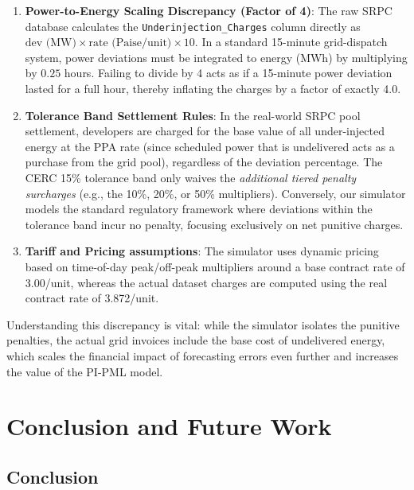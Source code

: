 \documentclass[12pt,a4paper]{report}
\begin{document}
\begin{enumerate}
  \item \textbf{Power-to-Energy Scaling Discrepancy (Factor of 4)}: The raw SRPC database calculates the \texttt{Underinjection\_Charges} column directly as $\text{dev (MW)} \times \text{rate (Paise/unit)} \times 10$. In a standard 15-minute grid-dispatch system, power deviations must be integrated to energy (MWh) by multiplying by $0.25$ hours. Failing to divide by 4 acts as if a 15-minute power deviation lasted for a full hour, thereby inflating the charges by a factor of exactly 4.0.
  \item \textbf{Tolerance Band Settlement Rules}: In the real-world SRPC pool settlement, developers are charged for the base value of all under-injected energy at the PPA rate (since scheduled power that is undelivered acts as a purchase from the grid pool), regardless of the deviation percentage. The CERC 15\% tolerance band only waives the \textit{additional tiered penalty surcharges} (e.g., the 10\%, 20\%, or 50\% multipliers). Conversely, our simulator models the standard regulatory framework where deviations within the tolerance band incur no penalty, focusing exclusively on net punitive charges.
  \item \textbf{Tariff and Pricing assumptions}: The simulator uses dynamic pricing based on time-of-day peak/off-peak multipliers around a base contract rate of \textnumero{}3.00/unit, whereas the actual dataset charges are computed using the real contract rate of \textnumero{}3.872/unit.
\end{enumerate}

Understanding this discrepancy is vital: while the simulator isolates the punitive penalties, the actual grid invoices include the base cost of undelivered energy, which scales the financial impact of forecasting errors even further and increases the value of the PI-PML model.

\chapter{Conclusion and Future Work}
\label{ch:conclusion}

\section{Conclusion}
\end{document}
